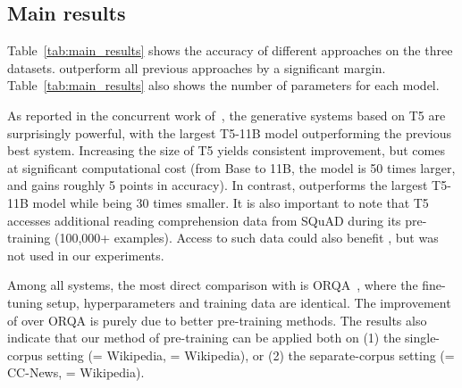 


\subsection{Main results}
Table~\ref{tab:main_results} shows the accuracy of different approaches on the three \openqa datasets. \thename outperform all previous approaches by a significant margin. Table~\ref{tab:main_results} also shows the number of parameters for each model. 

As reported in the concurrent work of~\citet{t5_openqa}, the generative \openqa systems based on T5 are surprisingly powerful, with the largest T5-11B model outperforming the previous best \openqa system.
Increasing the size of T5 yields consistent improvement, but comes at significant computational cost (from Base to 11B, the model is 50 times larger, and gains roughly 5 points in accuracy). In contrast, \thename outperforms the largest T5-11B model while being 30 times smaller. It is also important to note that T5 accesses additional reading comprehension data from SQuAD during its pre-training (100,000+ examples). Access to such data could also benefit \thename, but was not used in our experiments.



Among all systems, the most direct comparison with \thename is ORQA~\cite{orqa}, where the fine-tuning setup, hyperparameters and training data are identical. %
%
The improvement of \thename over ORQA is purely due to better pre-training methods. The results also indicate that our method of pre-training can be applied both on (1) the single-corpus setting (\target= Wikipedia, \unlabeled= Wikipedia), or (2) the separate-corpus setting (\target= CC-News, \unlabeled= Wikipedia).

